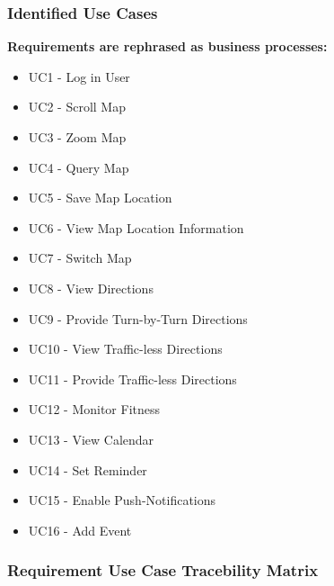 \documentclass[runningheads,a4paper]{article}
\begin{document}
\subsubsection{Identified Use Cases}
\textbf{Requirements are rephrased as business processes:}
\begin{itemize}
	\item UC1 - Log in User
	\item UC2 - Scroll Map
	\item UC3 - Zoom Map
	\item UC4 - Query Map
	\item UC5 - Save Map Location
	\item UC6 - View Map Location Information
	\item UC7 - Switch Map
	\item UC8 - View Directions
	\item UC9 - Provide Turn-by-Turn Directions
	\item UC10 - View Traffic-less Directions
	\item UC11 - Provide Traffic-less Directions
	\item UC12 - Monitor Fitness
	\item UC13 - View Calendar
	\item UC14 - Set Reminder
	\item UC15 - Enable Push-Notifications
	\item UC16 - Add Event 
\end{itemize}


\subsubsection{Requirement Use Case Tracebility Matrix}
\end{document}
